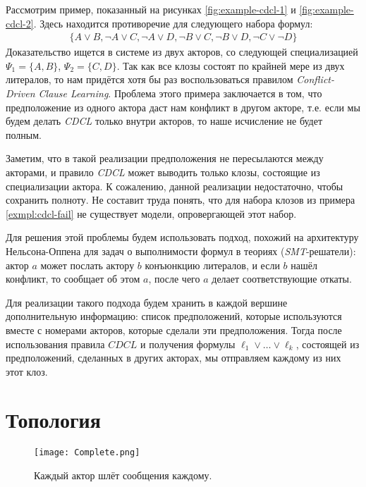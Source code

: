 \begin{example}
\label{exmpl:cdcl-fail}
Рассмотрим пример, показанный на рисунках \ref{fig:example-cdcl-1} и \ref{fig:example-cdcl-2}. Здесь находится противоречие для следующего набора формул: \begin{gather*}
			\{ A \vee B
             , \neg A \vee C
             , \neg A \vee D
             , \neg B \vee C
             , \neg B \vee D
             , \neg C \vee \neg D
            \}
		\end{gather*}
 Доказательство ищется в системе из двух акторов, со следующей специализацией $\Psi_1 = \{A, B\}$, $\Psi_2 = \{C, D\}$. Так как все клозы состоят по крайней мере из двух литералов, то нам придётся хотя бы раз воспользоваться правилом \emph{Conflict-Driven Clause Learning}. Проблема этого примера заключается в том, что предположение из одного актора даст нам конфликт в другом акторе, т.е. если мы будем делать \emph{CDCL} только внутри акторов, то наше исчисление не будет полным.
\end{example}

Заметим, что в такой реализации предположения не пересылаются между акторами, и правило \emph{CDCL} может выводить только клозы, состоящие из специализации актора. К сожалению, данной реализации недостаточно, чтобы сохранить полноту. Не составит труда понять, что для набора клозов из примера \ref{exmpl:cdcl-fail} не существует модели, опровергающей этот набор. 

Для решения этой проблемы будем использовать подход, похожий на архитектуру Нельсона-Оппена \cite{Nelson:1979:SCD:357073.357079} для задач о выполнимости формул в теориях (\emph{SMT}-решатели): актор $a$ может послать актору $b$ конъюнкцию литералов, и если $b$ нашёл конфликт, то сообщает об этом $a$, после чего $a$ делает соответствующие откаты.

Для реализации такого подхода будем хранить в каждой вершине дополнительную информацию: список предположений, которые используются вместе с номерами акторов, которые сделали эти предположения. Тогда после использования правила $CDCL$ и получения формулы $\ell_1 \vee \ldots \vee \ell_k$, состоящей из предположений, сделанных в других акторах, мы отправляем каждому из них этот клоз.


\section{Топология}
\begin{figure}[!h]
\centering
\texttt{[image: Complete.png]}
\caption{Каждый актор шлёт сообщения каждому.}\label{fig:complete}
\end{figure}

